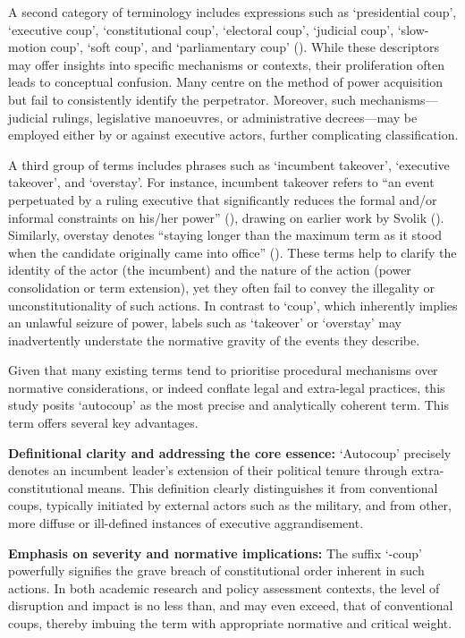\documentclass[
  12pt,
]{report}
\begin{document}
A second category of terminology includes expressions such as
`presidential coup', `executive coup', `constitutional coup', `electoral
coup', `judicial coup', `slow-motion coup', `soft coup', and
`parliamentary coup' (). While these descriptors may offer insights into
specific mechanisms or contexts, their proliferation often leads to
conceptual confusion. Many centre on the method of power acquisition but
fail to consistently identify the perpetrator. Moreover, such
mechanisms---judicial rulings, legislative manoeuvres, or administrative
decrees---may be employed either by or against executive actors, further
complicating classification.

A third group of terms includes phrases such as `incumbent takeover',
`executive takeover', and `overstay'. For instance, incumbent takeover
refers to ``an event perpetuated by a ruling executive that
significantly reduces the formal and/or informal constraints on his/her
power'' (),
drawing on earlier work by Svolik ().
Similarly, overstay denotes ``staying longer than the maximum term as it
stood when the candidate originally came into office''
(). These terms help to clarify the identity of the actor (the
incumbent) and the nature of the action (power consolidation or term
extension), yet they often fail to convey the illegality or
unconstitutionality of such actions. In contrast to `coup', which
inherently implies an unlawful seizure of power, labels such as
`takeover' or `overstay' may inadvertently understate the normative
gravity of the events they describe.

Given that many existing terms tend to prioritise procedural mechanisms
over normative considerations, or indeed conflate legal and extra-legal
practices, this study posits `autocoup' as the most precise and
analytically coherent term. This term offers several key advantages.

\textbf{Definitional clarity and addressing the core essence:}
`Autocoup' precisely denotes an incumbent leader's extension of their
political tenure through extra-constitutional means. This definition
clearly distinguishes it from conventional coups, typically initiated by
external actors such as the military, and from other, more diffuse or
ill-defined instances of executive aggrandisement.

\textbf{Emphasis on severity and normative implications:} The suffix
`-coup' powerfully signifies the grave breach of constitutional order
inherent in such actions. In both academic research and policy
assessment contexts, the level of disruption and impact is no less than,
and may even exceed, that of conventional coups, thereby imbuing the
term with appropriate normative and critical weight.
\end{document}
